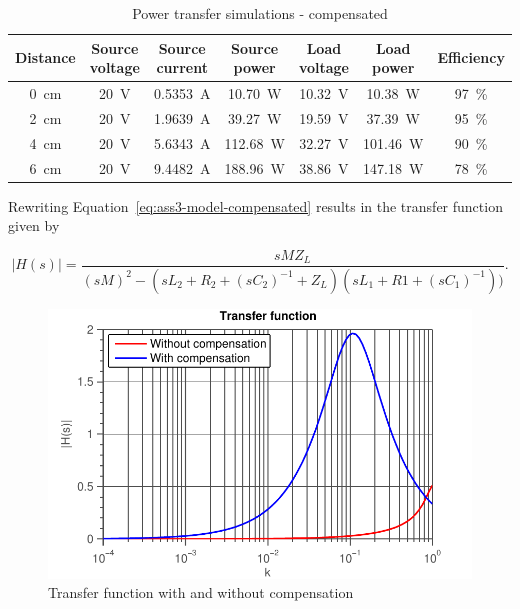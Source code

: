 \documentclass[11pt,titlepage]{report}
\begin{document}
\begin{table}[H]
	\centering
	\caption{Power transfer simulations - compensated}
	\label{tab:ass3-power-sim}
	\begin{tabular}{c c c c c c c}
		\hline\hline
		Distance & Source voltage & Source current & Source power & Load voltage & Load power & Efficiency \\
		\hline
		\SI{0}{cm} & \SI{20}{V} & \SI{0.5353}{A} & \SI{10.70}{W} & \SI{10.32}{V} & \SI{10.38}{W} & \SI{97}{\percent} \\
		\SI{2}{cm} & \SI{20}{V} & \SI{1.9639}{A} & \SI{39.27}{W} & \SI{19.59}{V} & \SI{37.39}{W} & \SI{95}{\percent} \\
		\SI{4}{cm} & \SI{20}{V} & \SI{5.6343}{A} & \SI{112.68}{W} & \SI{32.27}{V} & \SI{101.46}{W} & \SI{90}{\percent} \\
		\SI{6}{cm} & \SI{20}{V} & \SI{9.4482}{A} & \SI{188.96}{W} & \SI{38.86}{V} & \SI{147.18}{W} & \SI{78}{\percent} \\
		\hline
		\end{tabular}
\end{table}

Rewriting Equation~\ref{eq:ass3-model-compensated} results in the transfer function given by

\begin{equation} \label{eq:ass3-transfer-function}
	|H(s)| = \frac{s M Z_L}{(s M)^2 - (s L_2 + R_2 + (s C_2)^{-1} + Z_L) ( s L_1 + R1 + (s C_1)^{-1}))} .
\end{equation}

\begin{figure}[H]
	\begin{center}
		\includegraphics[width=0.8\linewidth]{resource/transfer_function-rc.pdf}
	\end{center}
	\caption{Transfer function with and without compensation}
	\label{fig:ass3-transfer-function}
\end{figure}
\end{document}
